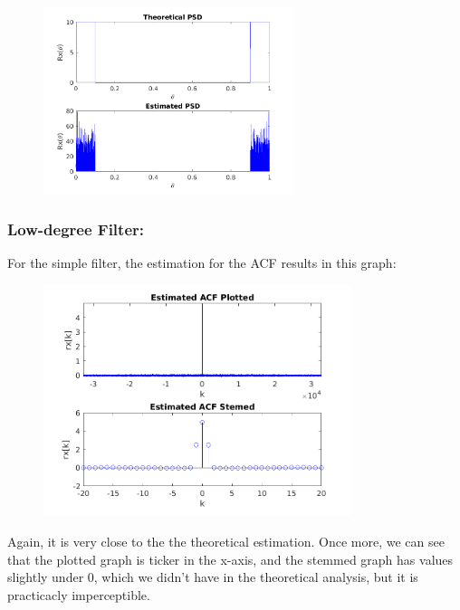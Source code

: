 \documentclass[a4paper,11pt]{article}
\begin{document}
\begin{figure}[!hp]
    \begin{center}
      \includegraphics[width=0.65\textwidth]{images/study1/comp_R_hd.png}
    \end{center}
\end{figure}

\newpage

\subsubsection{Low-degree Filter:}

For the simple filter, the estimation for the ACF results in this graph:

\begin{figure}[!hp]
    \begin{center}
      \includegraphics[width=0.8\textwidth]{images/study1/r_ld_es.png}
    \end{center}
\end{figure}

Again, it is very close to the the theoretical estimation. Once more, we can see
that the plotted graph is ticker in the x-axis, and the stemmed graph has values
slightly under 0, which we didn't have in the theoretical analysis, but it
is practicacly imperceptible.
\end{document}
